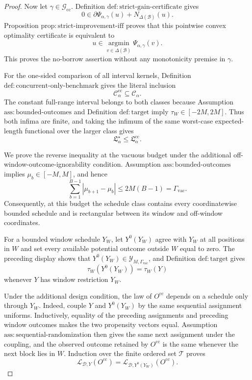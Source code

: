 \documentclass{article}
\begin{document}
\begin{proof}
Now let \(\gamma\in\mathcal G_{\mathrm{cc}}\).  Definition \(\mathrm{def:strict\text{-}gain\text{-}certificate}\) gives
\[
 0\in\partial\Psi_{\alpha,\gamma}(u)
      +N_{\Delta(\mathcal B)}(u).
\]
Proposition \(\mathrm{prop:strict\text{-}improvement\text{-}iff}\) proves that this pointwise convex optimality certificate is equivalent to
\[
 u\in\operatorname*{argmin}_{v\in\Delta(\mathcal B)}
 \Psi_{\alpha,\gamma}(v).
\]
This proves the no-borrow assertion without any monotonicity premise in \(\gamma\).

For the one-sided comparison of all interval kernels, Definition \(\mathrm{def:concurrent\text{-}only\text{-}benchmark}\) gives the literal inclusion
\[
 \mathcal C_\alpha^{\mathrm{cc}}\subseteq\mathcal C_\alpha.
\]
The constant full-range interval belongs to both classes because Assumption \(\mathrm{ass:bounded\text{-}outcomes}\) and Definition \(\mathrm{def:target}\) imply \(\tau_W\in[-2M,2M]\).  Thus both infima are finite, and taking the infimum of the same worst-case expected-length functional over the larger class gives
\[
 \mathfrak L_\alpha^\star\le\mathfrak L_\alpha^{\mathrm{cc}}.
\]

We prove the reverse inequality at the vacuous budget under the additional off-window-outcome-ignorability condition.  Assumption \(\mathrm{ass:bounded\text{-}outcomes}\) implies \(\mu_b\in[-M,M]\), and hence
\[
 \sum_{b=1}^{B-1}|\mu_{b+1}-\mu_b|
 \le 2M(B-1)=\Gamma_{\mathrm{vac}}.
\]
Consequently, at this budget the schedule class contains every coordinatewise bounded schedule and is rectangular between its window and off-window coordinates.

For a bounded window schedule \(Y_W\), let \(Y^0(Y_W)\) agree with \(Y_W\) at all positions in \(W\) and set every available potential outcome outside \(W\) equal to zero.  The preceding display shows that \(Y^0(Y_W)\in\mathcal Y_{M,\Gamma_{\mathrm{vac}}}\), and Definition \(\mathrm{def:target}\) gives
\[
 \tau_W(Y^0(Y_W))=\tau_W(Y)
\]
whenever \(Y\) has window restriction \(Y_W\).

Under the additional design condition, the law of \(O^{\mathrm{cc}}\) depends on a schedule only through \(Y_W\).  Indeed, couple \(Y\) and \(Y^0(Y_W)\) by the same sequential assignment uniforms.  Inductively, equality of the preceding assignments and preceding window outcomes makes the two propensity vectors equal.  Assumption \(\mathrm{ass:sequential\text{-}randomization}\) then gives the same next assignment under the coupling, and the observed outcome retained by \(O^{\mathrm{cc}}\) is the same whenever the next block lies in \(W\).  Induction over the finite ordered set \(\mathcal T\) proves
\[
 \mathcal L_{\mathcal D,Y}(O^{\mathrm{cc}})
 =\mathcal L_{\mathcal D,Y^0(Y_W)}(O^{\mathrm{cc}}).
\]


\end{proof}
\end{document}
